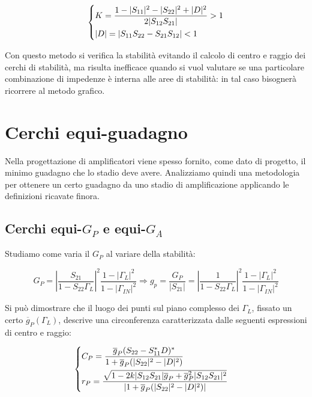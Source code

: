 \begin{equation}
\begin{dcases}
K = \frac{1- |S_{11}|^2-|S_{22}|^2+|D|^2}{2 |S_{12} S_{21}|} > 1\\
|D| = |S_{11} S_{22} - S_{21} S_{12}| < 1
\end{dcases}
\end{equation}

Con questo metodo si verifica la stabilità evitando il calcolo di centro e raggio dei cerchi di stabilità, ma risulta inefficace quando si vuol valutare se una particolare combinazione di impedenze è interna alle aree di stabilità: in tal caso bisognerà ricorrere al metodo grafico.

\section{Cerchi equi-guadagno}

Nella progettazione di amplificatori viene spesso fornito, come dato di progetto, il minimo guadagno che lo stadio deve avere. Analizziamo quindi una metodologia per ottenere un certo guadagno da uno stadio di amplificazione applicando le definizioni ricavate finora.

\subsection{Cerchi equi-$G_P$ e equi-$G_A$}
Studiamo come varia il $G_P$ al variare della stabilità:

\[ G_P = \left| \frac{S_{21}}{1 - S_{22}\Gamma_L} \right|^2
\frac{1- |\Gamma_L|^2}{1- |\Gamma_{IN}|^2} \Rightarrow g_p = \frac{G_P}{|S_{21}|} = \left| \frac{1}{1 - S_{22}\Gamma_L} \right|^2
\frac{1- |\Gamma_L|^2}{1- |\Gamma_{IN}|^2}\]

Si può dimostrare che il luogo dei punti sul piano complesso dei $\Gamma_L$, fissato un certo $\overline{g}_P(\Gamma_L)$, descrive una circonferenza caratterizzata dalle seguenti espressioni di centro e raggio:

%	

\begin{equation}
\begin{dcases}
C_{P} =\frac{\overline{g}_P (S_{22} - S_{11}^* D)^*}
{1+\overline{g}_P(|S_{22}|^2 - |D|^2)}\\
r_{P} = {\frac{\sqrt{1 - 2 k |S_{12}S_{21}|\overline{g}_P + \overline{g}_P^2 |S_{12} S_{21}|^2}}{|1+\overline{g}_P(|S_{22}|^2 - |D|^2)|}}
\end{dcases}
\quad
\end{equation}

